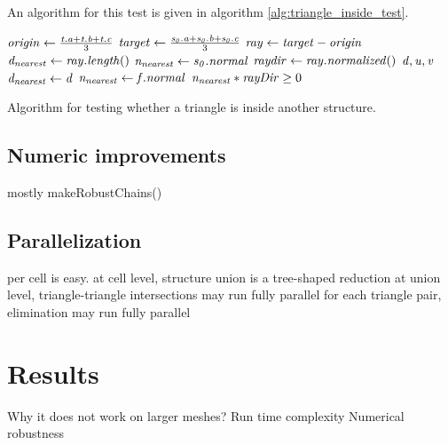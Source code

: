 An algorithm for this  test is given in algorithm \ref{alg:triangle_inside_test}. 
%
\begin{algorithm}
	\centering
	\begin{algorithmic}[1]
			\State $\mathit{origin} \gets \frac{\mathit{t.a} + \mathit{t.b} + \mathit{t.c}}{3}$ 
			\State $\mathit{target} \gets \frac{\mathit{s_0.a} + \mathit{s_0.b} + \mathit{s_0.c}}{3}$ 
			\State $\mathit{ray} \gets \mathit{target} - \mathit{origin}$
			\State $\mathit{d_{nearest}} \gets \mathit{ray.length}()$
			\State $\mathit{n_{nearest}} \gets \mathit{s_0.normal}$
			\State $\mathit{raydir} \gets \mathit{ray.normalized()}$
			 
				\State $\mathit{d}, \mathit{u}, \mathit{v}$
						\State $\mathit{d_{nearest}} \gets \mathit{d}$
						\State $\mathit{n_{nearest}} \gets \mathit{f.normal}$
					\EndIf
				\EndIf
			\EndFor
			\State \Return $\mathit{n_{nearest}} * \mathit{rayDir} \geq 0$
		\EndFunction
	\end{algorithmic}
	\caption{
		Algorithm for testing whether a triangle is inside another structure.
	}
	\label{alg:triangle_inside_test}
\end{algorithm}
%


\subsection{Numeric improvements}
\label{sec:numeric_improvements}

mostly makeRobustChains()


\subsection{Parallelization}
\label{sec:parallelization}


per cell is easy.
at cell level, structure union is a tree-shaped reduction
at union level, triangle-triangle intersections may run fully parallel for each triangle pair, elimination may run fully parallel




\section{Results}
\label{sec:direct_intersection_results}

Why it does not work on larger meshes?
Run time complexity
Numerical robustness

